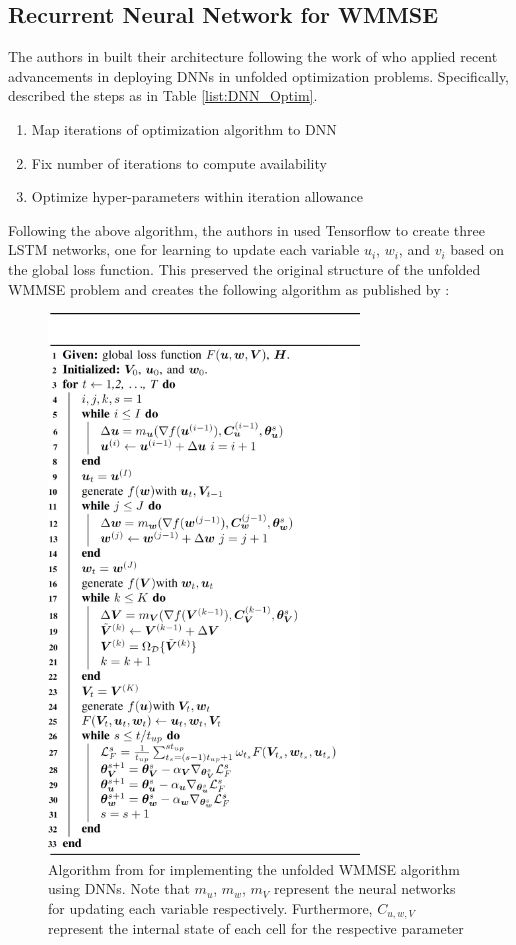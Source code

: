 \documentclass[journal]{IEEEtran}
\begin{document}
\subsection{Recurrent Neural Network for WMMSE}
The authors in \cite{LSTM_Net} built their architecture following the work of \cite{Deep_Unfolding} who applied recent advancements in deploying DNNs in unfolded optimization problems. Specifically, \cite{Deep_Unfolding} described the steps as in Table \ref{list:DNN_Optim}.

\begin{enumerate}
\item{Map iterations of optimization algorithm to DNN}
\item{Fix number of iterations to compute availability}
\item{Optimize hyper-parameters within iteration allowance}
\label{list:DNN_Optim}
\end{enumerate}

Following the above algorithm, the authors in \cite{LSTM_Net} used Tensorflow to create three LSTM networks, one for learning to update each variable $u_i$, $w_i$, and $v_i$ based on the global loss function. This preserved the original structure of the unfolded WMMSE problem and creates the following algorithm as published by \cite{LSTM_Net}:

\begin{figure}[h]%
\includegraphics[width=3.25in]{assets/9518251-alg-1-source-large.png}%
\caption{Algorithm from \cite{LSTM_Net} for implementing the unfolded WMMSE algorithm using DNNs. Note that $m_u$, $m_w$, $m_V$ represent the neural networks for updating each variable respectively. Furthermore, $C_{u,w,V}$ represent the internal state of each cell for the respective parameter}%
\label{fig:LSTM_Algo}%
\end{figure}
\end{document}
